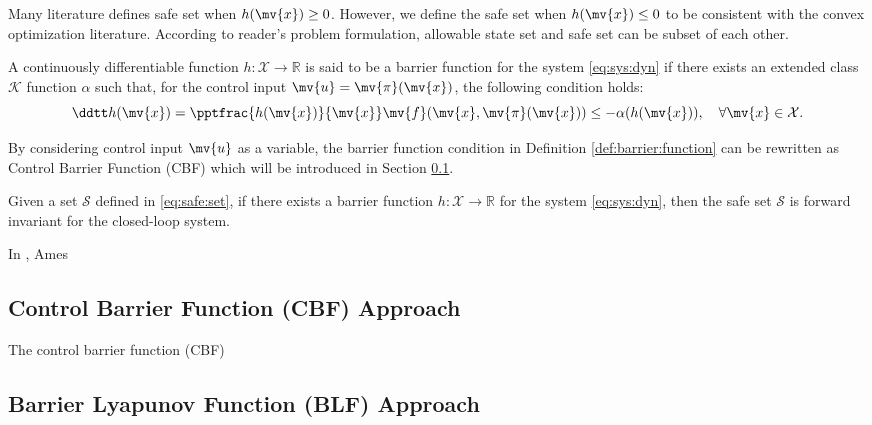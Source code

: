 Many literature defines safe set when $h(\mv{x}) \ge 0$.
However, we define the safe set when $h(\mv{x}) \le 0$ to be consistent with the convex optimization literature.
According to reader's problem formulation, allowable state set and safe set can be subset of each other.

\begin{definition} \label{def:barrier:function}
    A continuously differentiable function $h: \mathcal{X} \rightarrow \mathbb{R}$ is said to be a barrier function for the system \eqref{eq:sys:dyn} if there exists an extended class $\mathcal{K}$ function $\alpha$ such that, for the control input $\mv{u} = \mv{\pi}(\mv{x})$, the following condition holds:
    \begin{equation}
        \ddtt h(\mv{x}) =
        \pptfrac{h(\mv{x})}{\mv{x}} \mv{f}(\mv{x}, \mv{\pi}(\mv{x})) \le -\alpha(h(\mv{x}))
        ,
        \quad
        \forall \mv{x} \in \mathcal{X}
        .
    \end{equation}
\end{definition}

By considering control input $\mv{u}$ as a variable, the barrier function condition in Definition \ref{def:barrier:function} can be rewritten as Control Barrier Function (CBF) which will be introduced in Section \ref{sec:cbf}.

\begin{theorem} 
    Given a set $\mathcal{S}$ defined in \eqref{eq:safe:set}, if there exists a barrier function $h: \mathcal{X} \rightarrow \mathbb{R}$ for the system \eqref{eq:sys:dyn}, then the safe set $\mathcal{S}$ is forward invariant for the closed-loop system.
\end{theorem}


In \cite{Ames:2019aa}, Ames \etal 


\subsection{Control Barrier Function (CBF) Approach} \label{sec:cbf}

The control barrier function (CBF)  





\subsection{Barrier Lyapunov Function (BLF) Approach} \label{sec:blf}

